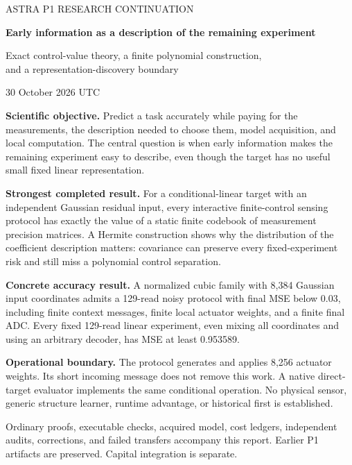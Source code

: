 \documentclass[11pt]{article}
\begin{document}
\hypersetup{pageanchor=false}
\begin{titlepage}
\vspace*{0.5in}
{\large\color{blue!45!black} ASTRA P1 \quad RESEARCH CONTINUATION}\par
\vspace{0.3in}
{\Huge\bfseries Early information as a description of the remaining experiment}\par
\vspace{0.25in}
{\Large Exact control-value theory, a finite polynomial construction,\\[3pt]and a representation-discovery boundary}\par
\vspace{0.3in}
30 October 2026 UTC

\vspace{0.2in}
\textbf{Scientific objective.} Predict a task accurately while paying for the measurements, the description needed to choose them, model acquisition, and local computation. The central question is when early information makes the remaining experiment easy to describe, even though the target has no useful small fixed linear representation.

\textbf{Strongest completed result.} For a conditional-linear target with an independent Gaussian residual input, every interactive finite-control sensing protocol has exactly the value of a static finite codebook of measurement precision matrices. A Hermite construction shows why the distribution of the coefficient description matters: covariance can preserve every fixed-experiment risk and still miss a polynomial control separation.

\textbf{Concrete accuracy result.} A normalized cubic family with 8,384 Gaussian input coordinates admits a 129-read noisy protocol with final MSE below 0.03, including finite context messages, finite local actuator weights, and a finite final ADC. Every fixed 129-read linear experiment, even mixing all coordinates and using an arbitrary decoder, has MSE at least 0.953589.

\textbf{Operational boundary.} The protocol generates and applies 8,256 actuator weights. Its short incoming message does not remove this work. A native direct-target evaluator implements the same conditional operation. No physical sensor, generic structure learner, runtime advantage, or historical first is established.

\vfill
Ordinary proofs, executable checks, acquired model, cost ledgers, independent audits, corrections, and failed transfers accompany this report. Earlier P1 artifacts are preserved. Capital integration is separate.
\end{titlepage}
\hypersetup{pageanchor=true}
\end{document}
